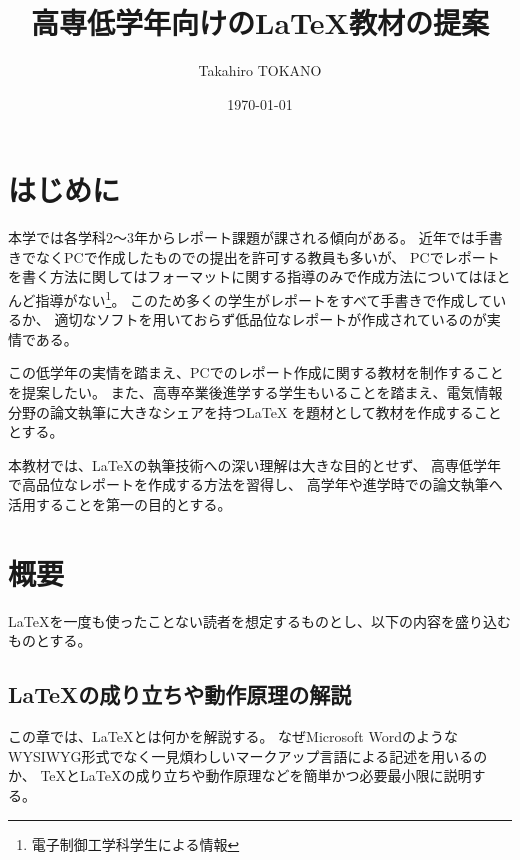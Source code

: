 \documentclass[uplatex]{jsarticle}
\title{高専低学年向けの\LaTeX 教材の提案}
\author{Takahiro TOKANO}
\date{\today}
\begin{document}
\maketitle

\section{はじめに}
	本学では各学科2～3年からレポート課題が課される傾向がある。
	近年では手書きでなくPCで作成したものでの提出を許可する教員も多いが、
	PCでレポートを書く方法に関してはフォーマットに関する指導のみで作成方法についてはほとんど指導がない\footnote{電子制御工学科学生による情報}。
    このため多くの学生がレポートをすべて手書きで作成しているか、
    適切なソフトを用いておらず低品位なレポートが作成されているのが実情である。

    この低学年の実情を踏まえ、PCでのレポート作成に関する教材を制作することを提案したい。
	また、高専卒業後進学する学生もいることを踏まえ、電気情報分野の論文執筆に大きなシェアを持つ\LaTeX
    を題材として教材を作成することとする。
    
    本教材では、\LaTeX の執筆技術への深い理解は大きな目的とせず、
    高専低学年で高品位なレポートを作成する方法を習得し、
    高学年や進学時での論文執筆へ活用することを第一の目的とする。

\section{概要}
	\LaTeX を一度も使ったことない読者を想定するものとし、以下の内容を盛り込むものとする。

    
    \subsection{\LaTeX の成り立ちや動作原理の解説}
        この章では、\LaTeX とは何かを解説する。
        なぜMicrosoft WordのようなWYSIWYG形式でなく一見煩わしいマークアップ言語による記述を用いるのか、
        \TeX と\LaTeX の成り立ちや動作原理などを簡単かつ必要最小限に説明する。
\end{document}
